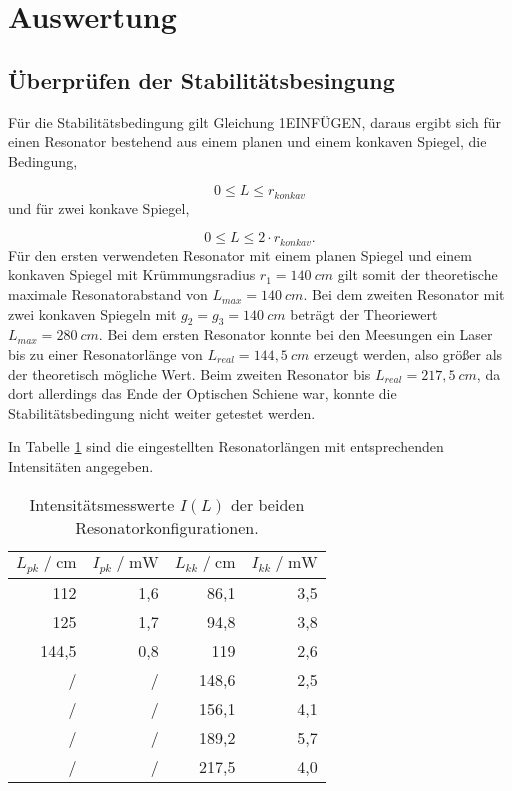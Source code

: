 \section{Auswertung}
\label{sec:Auswertung}

\subsection{Überprüfen der Stabilitätsbesingung}
\label{sec:Überprüfen der Stabilitätsbesingung}

Für die Stabilitätsbedingung gilt Gleichung 1EINFÜGEN, daraus ergibt sich für einen Resonator bestehend aus einem planen und einem konkaven Spiegel, 
die Bedingung,

\begin{equation}
\label{equ:}
  0 \leq L \leq r_{konkav}
\end{equation}
und für zwei konkave Spiegel,

\begin{equation}
\label{equ:}
  0 \leq L \leq 2 \cdot r_{konkav}.
\end{equation}
Für den ersten verwendeten Resonator mit einem planen Spiegel und einem konkaven Spiegel mit Krümmungsradius $r_1 = 140 \: cm$ gilt somit der 
theoretische maximale Resonatorabstand von $L_{max} = 140 \: cm$.
Bei dem zweiten Resonator mit zwei konkaven Spiegeln mit $g_2 = g_3 = 140 \: cm$ beträgt der Theoriewert $L_{max} = 280 \: cm$.
Bei dem ersten Resonator konnte bei den Meesungen ein Laser bis zu einer Resonatorlänge von $L_{real} = 144,5 \: cm$ erzeugt werden,
also größer als der theoretisch mögliche Wert.
Beim zweiten Resonator bis $L_{real} = 217,5 \: cm$, da dort allerdings das Ende der Optischen Schiene war, konnte die Stabilitätsbedingung nicht weiter getestet werden.

In Tabelle \ref{tab:1} sind die eingestellten Resonatorlängen mit entsprechenden Intensitäten angegeben.


\begin{table}[H]
  \centering
  \footnotesize
  \caption{Intensitätsmesswerte $I(L)$ der beiden Resonatorkonfigurationen.}
  \label{tab:1}
  \begin{tabular}{r r | r r}
  \toprule
  $L_{pk} \;/\; \si{\centi\meter}$ & $I_{pk} \;/\; \si{\milli\watt}$ & $L_{kk} \;/\; \si{\centi\meter}$ & $I_{kk} \;/\; \si{\milli\watt}$ \\
  \midrule
  112   & 1,6 & 86,1 & 3,5 \\
  125   & 1,7 & 94,8 & 3,8 \\
  144,5 & 0,8 & 119 & 2,6 \\
  /     & /   & 148,6 & 2,5 \\
  /     & /   & 156,1 & 4,1 \\  
  /     & /   & 189,2 & 5,7 \\
  /     & /   & 217,5 & 4,0 \\
  \bottomrule
  \end{tabular}
\end{table}


